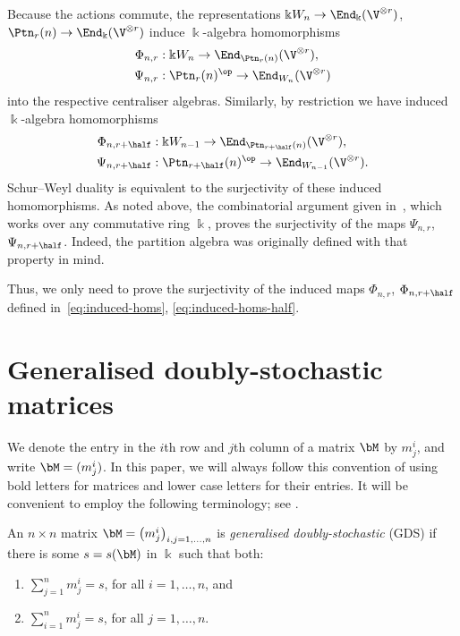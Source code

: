 Because the actions commute, the representations $\Bbbk W_n
\to \End_\Bbbk(\V^{\otimes r})$, $\Ptn_r(n) \to \End_\Bbbk(\V^{\otimes
 r})$ induce $\Bbbk$-algebra homomorphisms
\begin{equation}\label{eq:induced-homs}
\begin{aligned}
 \Phi_{n,r}&: \Bbbk W_n \to \End_{\Ptn_r(n)}( \V^{\otimes r} ),\\
 \Psi_{n,r}&: \Ptn_r(n)^{\op} \to \End_{W_n}( \V^{\otimes r} )
\end{aligned}
\end{equation}
into the respective centraliser algebras. Similarly, by restriction we
have induced $\Bbbk$-algebra homomorphisms
\begin{equation}\label{eq:induced-homs-half}
\begin{aligned}
 \Phi_{n,r+\half}&: \Bbbk W_{n-1}
 \to \End_{\Ptn_{r+\half}(n)}(\V^{\otimes r} ), \\ \Psi_{n,r+\half}&:
 \Ptn_{r+\half}(n)^{\op} \to \End_{W_{n-1}}( \V^{\otimes r} ).
\end{aligned}
\end{equation}
Schur--Weyl duality is equivalent to the surjectivity of these induced
homomorphisms. As noted above, the combinatorial argument given in~\cite[Thm.~3.6]{HR-2005}, which works over any commutative ring
$\Bbbk$, proves the surjectivity of the maps $\Psi_{n,r}$,
$\Psi_{n,r+\half}$. Indeed, the partition algebra was originally
defined with that property in mind.

Thus, we only need to prove the surjectivity of the induced maps
$\Phi_{n,r}$, $\Phi_{n,r+\half}$ defined in~\eqref{eq:induced-homs}, \eqref{eq:induced-homs-half}.



\section{Generalised doubly-stochastic matrices}%
\label{sec:GDS}%
We denote the entry in the $i$th row and $j$th column of a matrix
$\bM$ by $m^i_j$, and write $\bM=(m^i_j)$. In this paper, we will
always follow this convention of using bold letters for matrices and
lower case letters for their entries. 
It will be convenient to employ the following terminology; see \eg \cite{Brualdi, Johnsen, Gibson, Lai}.

\begin{defi}\label{def:GDS}
 An $n \times n$ matrix $\bM = \big( m^i_j \big)_{i,j = 1, \dots, n}$
 is \emph{generalised doubly-stochastic} (GDS) if there is some $s =
 s(\bM)$ in $\Bbbk$ such that both:
 \begin{enumerate}[label=(\alph*)]
 \item $\sum_{j=1}^n m^i_j = s$, for all $i=1, \dots, n$, and
 \item $\sum_{i=1}^n m^i_j = s$, for all $j = 1, \dots, n$. 
 \end{enumerate}
\end{defi}

